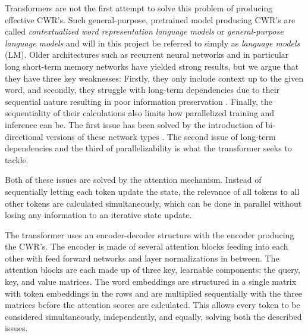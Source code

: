 \documentclass[main.tex]{subfiles}
\begin{document}
Transformers are not the first attempt to solve this problem of producing effective CWR's.
Such general-purpose, pretrained model producing CWR's are called  \emph{contextualized word representation language models} or \emph{general-purpose language models} \cite[Ch. 2]{birk2020knowledge} and will in this project be referred to simply as \emph{language models} (LM).
Older architectures such as recurrent neural networks \cite[Ch. 10]{Goodfellow-et-al-2016} and in particular long short-term memory networks \cite{hochreiter1997lstm} have yielded strong results, but we argue that they have three key weaknesses:
Firstly, they only include context up to the given word, and secondly, they struggle with long-term dependencies due to their sequential nature resulting in poor information preservation \cite{Goodfellow-et-al-2016}.
Finally, the sequentiality of their calculations also limits how parallelized training and inference can be.
The first issue has been solved by the introduction of bi-directional versions of these network types \cite{schuster1997birnn}.
The second issue of long-term dependencies and the third of parallelizability is what the transformer seeks to tackle.

Both of these issues are solved by the attention mechanism.
Instead of sequentially letting each token update the state, the relevance of all tokens to all other tokens are calculated simultaneously, which can be done in parallel without losing any information to an iterative state update.

The transformer uses an encoder-decoder structure with the encoder producing the CWR's.
The encoder is made of several attention blocks feeding into each other with feed forward networks and layer normalizations in between.
The attention blocks are each made up of three key, learnable components: the query, key, and value matrices.
The word embeddings are structured in a single matrix with token embeddings in the rows and are multiplied sequentially with the three matrices before the attention scores are calculated.
This allows every token to be considered simultaneously, independently, and equally, solving both the described issues.
\cite{vaswani2017att}
\end{document}
